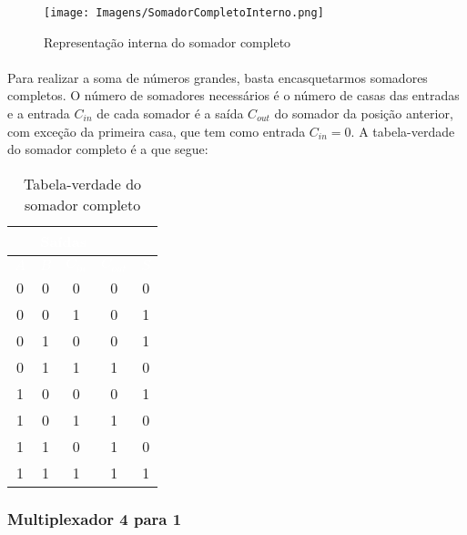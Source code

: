 \documentclass[a4paper,12pt]{article}
\begin{document}
\begin{figure}[H]
    \centering
    \texttt{[image: Imagens/SomadorCompletoInterno.png]}
    \caption{Representação interna do somador completo}
    \label{fig:somador_interna}
\end{figure}

\newpage

\paragraph{}
Para realizar a soma de números grandes, basta encasquetarmos somadores completos. O número de somadores necessários é o número de casas das entradas e a entrada $C_{in}$ de cada somador é a saída $C_{out}$ do somador da posição anterior, com exceção da primeira casa, que tem como entrada $C_{in} = 0$. A tabela-verdade do somador completo é a que segue:

\begin{table}[H]
    \centering
    \begin{tabular}{|c|c|c|c|c|}
        \hline
        \rowcolor{black}
        \multicolumn{3}{|c|}{\textbf{\textcolor{white}{Entradas}}} & \multicolumn{2}{|c|}{\textbf{\textcolor{white}{Saídas}}} \\ \hline
        \rowcolor{black}
        \textcolor{white}{$A$} & \textcolor{white}{$B$} & \textcolor{white}{$C_{in}$} & \textcolor{white}{$C_{out}$} & \textcolor{white}{$S$} \\ \hline
        0 & 0 & 0 & 0 & 0 \\ \hline
        \rowcolor{cinza}
        0 & 0 & 1 & 0 & 1 \\ \hline
        0 & 1 & 0 & 0 & 1 \\ \hline
        \rowcolor{cinza}
        0 & 1 & 1 & 1 & 0 \\ \hline
        1 & 0 & 0 & 0 & 1 \\ \hline
        \rowcolor{cinza}
        1 & 0 & 1 & 1 & 0 \\ \hline
        1 & 1 & 0 & 1 & 0 \\ \hline
        \rowcolor{cinza}
        1 & 1 & 1 & 1 & 1 \\ \hline
    \end{tabular}
    \caption{Tabela-verdade do somador completo}
\end{table}

\subsubsection{Multiplexador 4 para 1}
\end{document}
